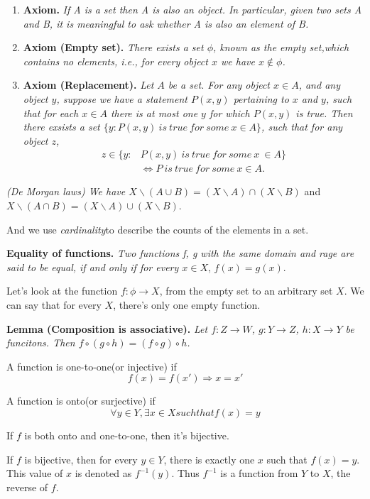 \documentclass{article}
\begin{document}
\begin{enumerate}
	\item{
	      \textbf{Axiom.}
	      \emph{If A is a set then A is also an object.
		      In particular, given two sets A and B, it is meaningful to ask whether A is also an element of B.}
	      }
	\item{
	      \textbf{Axiom (Empty set).}
	      \emph{There exists a set \(\phi\), known as the empty set,which contains no elements, i.e., for every object \(x\) we have \(x \notin \phi\).}}
	\item{
	      \textbf{Axiom (Replacement).}
	      \emph{Let \(A\) be a set. For any object \(x \in A\), and any object \(y\), suppose we have a statement \(P(x, y)\) pertaining to \(x\) and \(y\),
		      such that for each \(x \in A\) there is at most one \(y\) for which \(P(x, y)\) is true.
		      Then there exsists a set \(\{y: P(x, y)\ is\ true\ for\ some\ x \in A\}\), such that for any object \(z\),
          }
          \[\begin{aligned} 
            z \in \{ y:{}& P(x, y)\ is\ true\ for\ some\ x\ \in A \} \\ 
            & \Leftrightarrow P\ is\ true\ for\ some\ x \in A. 
          \end{aligned}\]
          }
\end{enumerate}

\emph{(De Morgan laws) We have \(X \backslash (A \cup B) = (X \backslash A) \cap (X \backslash B)\)} and \(X \backslash (A \cap B) = (X \backslash A) \cup (X \backslash B)\).

And we use \emph{cardinality}to describe the counts of the elements in a set.


\textbf{Equality of functions.} \emph{Two functions f, g with the same domain and rage are said to be equal, if and only if for every \(x \in X\)}, \(f(x) = g(x)\).

Let's look at the function \(f: \phi \rightarrow X\), from the empty set to an arbitrary set \(X\). We can say that for every \(X\), there's only one empty function.

\textbf{Lemma (Composition is associative).} \emph{
        Let \(f: Z \rightarrow W\), \(g: Y \rightarrow Z\), \(h: X \rightarrow Y\) be funcitons.
        Then \(f \circ (g \circ h)=(f \circ g) \circ h\).
}

A function is one-to-one(or injective) if \[
    f(x) = f(x') \Rightarrow x = x'
\]

A function is onto(or surjective) if \[
    \forall y \in Y, \exists x \in X such that f(x) = y
\]

If \(f\) is both onto and one-to-one, then it's bijective.

If \(f\) is bijective, then for every \(y \in Y\), there is exactly one \(x\) such that \(f(x) = y\).
This value of \(x\) is denoted as \(f^{-1}(y)\).
Thus \(f^{-1}\) is a function from \(Y\) to \(X\), the reverse of \(f\).
\end{document}
